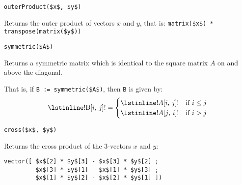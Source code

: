 \begin{functiondefinition}[outerProduct]
\begin{synopsis}\begin{lstlisting}
outerProduct($x$, $y$)
\end{lstlisting}\end{synopsis}
\begin{semantics}
Returns the outer product of vectors $x$ and $y$, that is: \lstinline!matrix($x$) * transpose(matrix($y$))!
\end{semantics}
\end{functiondefinition}

\begin{functiondefinition}[symmetric]
\begin{synopsis}\begin{lstlisting}
symmetric($A$)
\end{lstlisting}\end{synopsis}
\begin{semantics}
Returns a symmetric matrix which is identical to the square matrix $A$ on and above the diagonal.

That is, if \lstinline!B := symmetric($A$)!, then \lstinline!B! is given by:
\begin{equation*}
\text{\lstinline!B[$i$, $j$]!} =
\begin{cases}
\text{\lstinline!$A$[$i$, $j$]!} & \text{if $i \leq j$}\\
\text{\lstinline!$A$[$j$, $i$]!} & \text{if $i > j$}
\end{cases}
\end{equation*}
\end{semantics}
\end{functiondefinition}

\begin{functiondefinition}[cross]
\begin{synopsis}\begin{lstlisting}
cross($x$, $y$)
\end{lstlisting}\end{synopsis}
\begin{semantics}
Returns the cross product of the 3-vectors $x$ and $y$:
\begin{lstlisting}[frame=none]
vector([ $x$[2] * $y$[3] - $x$[3] * $y$[2] ;
         $x$[3] * $y$[1] - $x$[1] * $y$[3] ;
         $x$[1] * $y$[2] - $x$[2] * $y$[1] ])
\end{lstlisting}
\end{semantics}
\end{functiondefinition}

